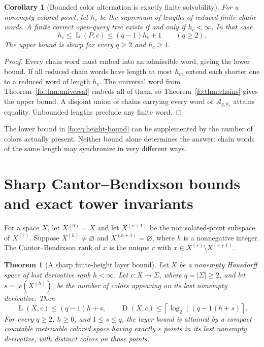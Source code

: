 \documentclass[11pt,letterpaper]{article}
\numberwithin{equation}{section}
\newtheorem{theorem}{Theorem}[section]
\newtheorem{corollary}[corollary]{Corollary}
\theoremstyle{definition}
\theoremstyle{remark}
\theoremstyle{definition}
\newcommand{\ceil}[1]{\left\lceil#1\right\rceil}
\newcommand{\A}{\mathcal A}
\newcommand{\depth}{\operatorname{D}}
\newcommand{\layers}{\operatorname{L}}
\newcommand{\len}[1]{\lvert #1\rvert}
\begin{document}
\begin{corollary}[Bounded color alternation is exactly finite solvability]
\label{fo:cor:height}
For a nonempty colored poset, let $h_c$ be the supremum of lengths of reduced
finite chain words. A finite correct open-query tree exists if and only if
$h_c<\infty$. In that case
\begin{equation}\label{fo:eq:height-bound}
 h_c\le\layers(P,c)\le(q-1)h_c+1
 \qquad(q\ge2).
\end{equation}
The upper bound is sharp for every $q\ge2$ and $h_c\ge1$.
\end{corollary}
\begin{proof}
Every chain word must embed into an admissible word, giving the lower bound.
If all reduced chain words have length at most $h_c$, extend each shorter one
to a reduced word of length $h_c$. The universal word from
Theorem~\ref{fo:thm:universal} embeds all of them, so Theorem~\ref{fo:thm:chains}
gives the upper bound. A disjoint union of chains carrying every word of
$\A_{q,h_c}$ attains equality. Unbounded lengths preclude any finite word.
\end{proof}

The lower bound in \eqref{fo:eq:height-bound} can be supplemented by the number of
colors actually present. Neither bound alone determines the answer: chain
words of the same length may synchronize in very different ways.

\section{Sharp Cantor--Bendixson bounds and exact tower invariants}
\label{fo:sec:CB}

For a space $X$, let $X^{(0)}=X$ and let $X^{(r+1)}$ be the nonisolated-point
subspace of $X^{(r)}$. Suppose $X^{(h)}\ne\varnothing$ and
$X^{(h+1)}=\varnothing$, where $h$ is a nonnegative integer. The
Cantor--Bendixson rank of $x$ is the unique $r$ with
$x\in X^{(r)}\setminus X^{(r+1)}$.

\begin{theorem}[A sharp finite-height layer bound]\label{fo:thm:CB}
Let $X$ be a nonempty Hausdorff space of last derivative rank $h<\infty$.
Let $c:X\to\Sigma$, where $q=\len{\Sigma}\ge2$, and let
$s=\len{c(X^{(h)})}$ be the number of colors appearing on its last nonempty
derivative. Then
\begin{equation}\label{fo:eq:CB-bound}
 \layers(X,c)\le(q-1)h+s,
 \qquad
 \depth(X,c)\le\ceil{\log_2((q-1)h+s)}.
\end{equation}
For every $q\ge2$, $h\ge0$, and $1\le s\le q$, the layer bound is attained by
a compact countable metrizable colored space having exactly $s$ points in its
last nonempty derivative, with distinct colors on those points.
\end{theorem}
\end{document}

